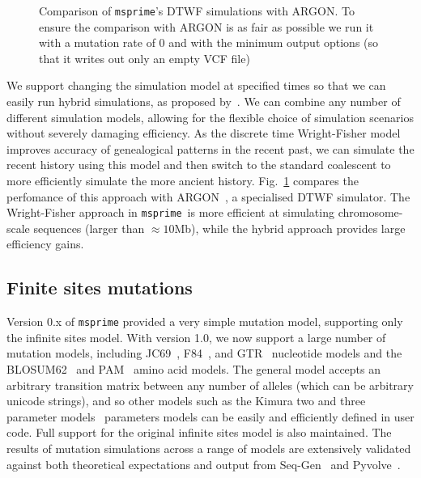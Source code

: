 \documentclass{article}
\newcommand{\msprime}[0]{\texttt{msprime}}
\begin{document}
\begin{figure}
\begin{center}
\end{center}
\caption{\label{fig-dtwf-perf} Comparison of \msprime's DTWF
simulations with ARGON. To ensure the comparison with ARGON is
as fair as possible we run it with a mutation rate of 0 and with
the minimum output options (so that it writes out only an empty VCF file)}
\end{figure}

We support changing the simulation model at specified times so that we can
easily run hybrid simulations, as proposed by~\cite{bhaskar2014distortion}. We
can combine any number of different simulation models, allowing for the
flexible choice of simulation scenarios without severely damaging efficiency.
As the discrete time Wright-Fisher model improves accuracy of genealogical
patterns in the recent past, we can simulate the recent history using this
model and then switch to the standard coalescent to more efficiently simulate
the more ancient history. Fig.~\ref{fig-dtwf-perf} compares the perfomance of
this approach with ARGON~\citep{palamara2016argon}, a specialised DTWF
simulator.  The Wright-Fisher approach in \msprime\ is more efficient at
simulating chromosome-scale sequences (larger than $\approx10$Mb), while the
hybrid approach provides large efficiency gains.

\subsection*{Finite sites mutations}
Version 0.x of \texttt{msprime} provided a very simple mutation model,
supporting only the infinite sites model.
With version 1.0, we now support a large number of mutation models,
including
JC69~\citep{jukes1969evolution},
F84~\citep{felsenstein1996hidden},
and GTR~\citep{tavare1986some} nucleotide models
and the BLOSUM62~\citep{henikoff1992amino}
and PAM~\citep{dayhoff1978} amino acid models.
The general model accepts an arbitrary transition matrix between
any number of alleles (which can be arbitrary unicode strings),
and so other models such as the Kimura two and three
parameter models~\citep{kimura1980simple,kimura1981estimation}
parameters models can be easily
and efficiently defined in user code.
Full support for the original infinite sites model is also maintained.
The results of mutation simulations across a range of models are
extensively validated
against both theoretical expectations and output from
Seq-Gen~\citep{rambaut1997seq} and
Pyvolve~\citep{spielman2015pyvolve}.
\end{document}
